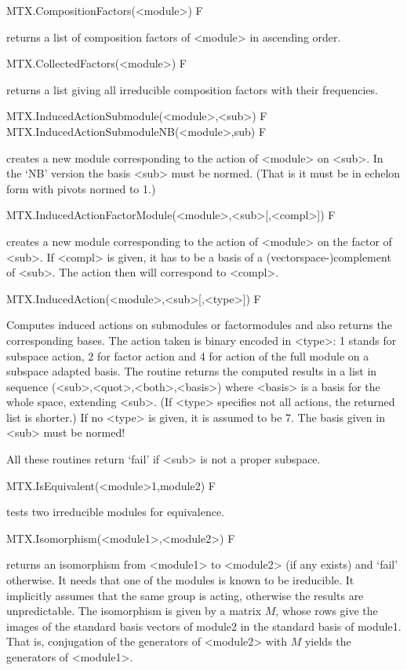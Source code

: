 \>MTX.CompositionFactors(<module>) F

returns a list of composition factors of <module> in ascending order.

\>MTX.CollectedFactors(<module>) F

returns a list giving all irreducible composition factors with their
frequencies.


\>MTX.InducedActionSubmodule(<module>,<sub>) F
\>MTX.InducedActionSubmoduleNB(<module>,sub) F

creates a new module corresponding to the action of <module> on <sub>. In
the `NB' version the basis <sub> must be normed. (That is it must be in
echelon form with pivots normed to 1.)

\>MTX.InducedActionFactorModule(<module>,<sub>[,<compl>]) F

creates a new module corresponding to the action of <module> on the
factor of <sub>. If <compl> is given, it has to be a basis of a
(vectorspace-)complement of <sub>. The action then will correspond to
<compl>.

\>MTX.InducedAction(<module>,<sub>[,<type>]) F

Computes induced actions on submodules or factormodules and also returns the
corresponding bases. The action taken is binary encoded in <type>:
1 stands for subspace action, 2 for
factor action and 4 for action of the full module
on a subspace adapted basis.
The routine returns the computed results in a list in sequence
(<sub>,<quot>,<both>,<basis>) where <basis> is a basis for the whole space,
extending <sub>. (If <type> specifies not all actions, the returned list
is shorter.)
If no <type> is given, it is assumed to be 7.
The basis given in <sub> must be normed!

All these routines return `fail' if <sub> is not a proper subspace.


\>MTX.IsEquivalent(<module>1,module2) F

tests two irreducible modules for equivalence.

\>MTX.Isomorphism(<module1>,<module2>) F

returns an isomorphism from <module1> to <module2> (if any exists) and 
`fail' otherwise. It needs that one of the modules is known to be
ireducible. It implicitly assumes that the same group is acting, otherwise
the results are unpredictable.
The isomorphism is given by a matrix $M$, whose rows give the images of the
standard basis vectors of module2 in the standard basis of module1. That is,
conjugation of the generators of <module2> with $M$ yields the
generators of <module1>.

